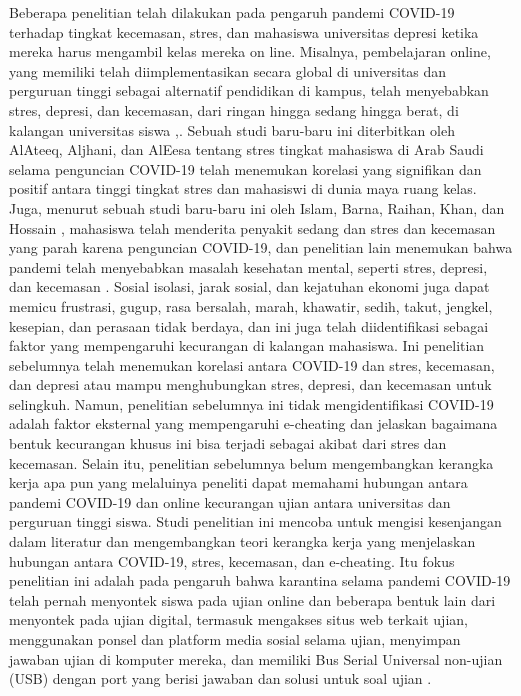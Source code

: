 Beberapa penelitian telah dilakukan pada pengaruh pandemi COVID-19 terhadap tingkat kecemasan, stres, dan mahasiswa universitas depresi ketika mereka harus mengambil kelas mereka on line. Misalnya, pembelajaran online, yang memiliki telah diimplementasikan secara global di universitas dan perguruan tinggi sebagai alternatif pendidikan di kampus, telah menyebabkan stres, depresi, dan kecemasan, dari ringan hingga sedang hingga berat, di kalangan universitas siswa \citep{fawaz2021learning} ,\citep{kecojevic2020impact}. Sebuah studi baru-baru ini diterbitkan oleh AlAteeq, Aljhani, dan AlEesa \citep{alateeq2020perceived} tentang stres tingkat mahasiswa di Arab Saudi selama penguncian COVID-19 telah menemukan korelasi yang signifikan dan positif antara tinggi tingkat stres dan mahasiswi di dunia maya ruang kelas. Juga, menurut sebuah studi baru-baru ini oleh Islam, Barna, Raihan, Khan, dan Hossain \citep{islam2020depression}, mahasiswa telah menderita penyakit sedang dan stres dan kecemasan yang parah karena penguncian COVID-19, dan penelitian lain menemukan bahwa pandemi telah menyebabkan masalah kesehatan mental, seperti stres, depresi, dan kecemasan \citep{aylie2020psychological}. Sosial isolasi, jarak sosial, dan kejatuhan ekonomi juga dapat memicu frustrasi, gugup, rasa bersalah, marah, khawatir, sedih, takut, jengkel, kesepian, dan perasaan tidak berdaya, dan ini juga telah diidentifikasi sebagai faktor yang mempengaruhi kecurangan di kalangan mahasiswa. Ini penelitian sebelumnya telah menemukan korelasi antara COVID-19 dan stres, kecemasan, dan depresi atau mampu menghubungkan stres, depresi, dan kecemasan untuk selingkuh. Namun, penelitian sebelumnya ini tidak mengidentifikasi COVID-19 adalah faktor eksternal yang mempengaruhi e-cheating dan jelaskan bagaimana bentuk kecurangan khusus ini bisa terjadi sebagai akibat dari stres dan kecemasan. Selain itu, penelitian sebelumnya belum mengembangkan kerangka kerja apa pun yang melaluinya peneliti dapat memahami hubungan antara pandemi COVID-19 dan online kecurangan ujian antara universitas dan perguruan tinggi siswa. Studi penelitian ini mencoba untuk mengisi kesenjangan dalam literatur dan mengembangkan teori kerangka kerja yang menjelaskan hubungan antara COVID-19, stres, kecemasan, dan e-cheating. Itu fokus penelitian ini adalah pada pengaruh bahwa karantina selama pandemi COVID-19 telah pernah menyontek siswa pada ujian online dan beberapa bentuk lain dari menyontek pada ujian digital, termasuk mengakses situs web terkait ujian, menggunakan ponsel dan platform media sosial selama ujian, menyimpan jawaban ujian di komputer mereka, dan memiliki Bus Serial Universal non-ujian (USB) dengan port yang berisi jawaban dan solusi untuk soal ujian \citep{baker2008student}.

